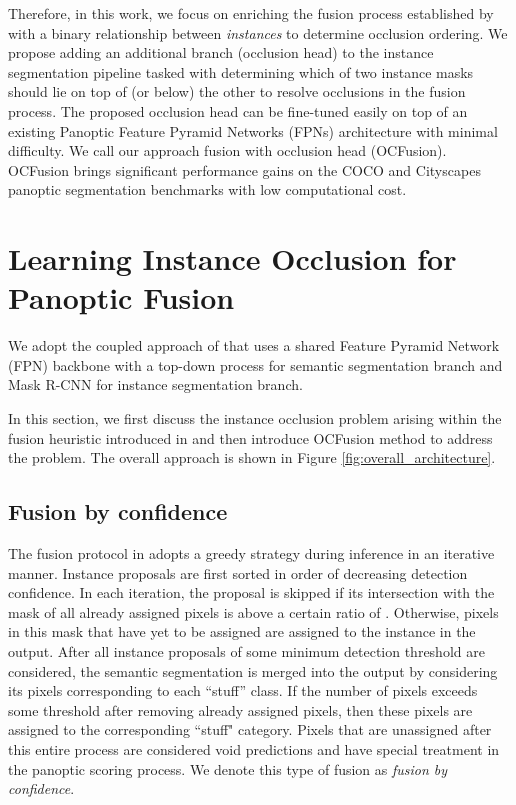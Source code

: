 \documentclass[10pt,twocolumn,letterpaper]{article}
\begin{document}
Therefore, in this work, we focus on enriching the fusion process established by \cite{kirillov2018panoptic} with a binary relationship between \textit{instances} to determine occlusion ordering. We propose adding an additional branch (occlusion head) to the instance segmentation pipeline tasked with determining which of two instance masks should lie on top of (or below) the other to resolve occlusions in the fusion process. The proposed occlusion head can be fine-tuned easily on top of an existing Panoptic Feature Pyramid Networks (FPNs) \cite{kirillov2019panoptic} architecture with minimal difficulty. We call our approach fusion with occlusion head (OCFusion). OCFusion brings significant performance gains on the COCO and Cityscapes panoptic segmentation benchmarks with low computational cost. 

\section{Learning Instance Occlusion for Panoptic Fusion}


We adopt the coupled approach of \cite{kirillov2019panoptic} that uses a shared Feature Pyramid Network (FPN) \cite{FPN} backbone with a top-down process for semantic segmentation branch and Mask R-CNN \cite{he2017mask} for instance segmentation branch.

In this section, we first discuss the instance occlusion problem arising within the fusion heuristic introduced in \cite{kirillov2018panoptic} and then introduce OCFusion method to address the problem. The overall approach is shown in Figure \ref{fig:overall_architecture}.

\subsection{Fusion by confidence} \label{fusing-instances}

The fusion protocol in \cite{kirillov2018panoptic} adopts a greedy strategy during inference in an iterative manner. Instance proposals are first sorted in order of decreasing detection confidence. In each iteration, the proposal is skipped if its intersection with the mask of all already assigned pixels is above a certain ratio of . Otherwise, pixels in this mask that have yet to be assigned are assigned to the instance in the output. After all instance proposals of some minimum detection threshold are considered, the semantic segmentation is merged into the output by considering its pixels corresponding to each ``stuff'' class. If the number of pixels exceeds some threshold after removing already assigned pixels, then these pixels are assigned to the corresponding ``stuff" category. Pixels that are unassigned after this entire process are considered void predictions and have special treatment in the panoptic scoring process. We denote this type of fusion as \textit{fusion by confidence}.
\end{document}

